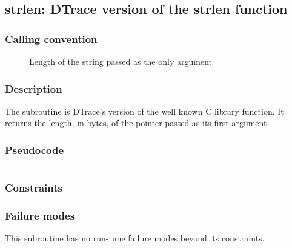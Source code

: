 \clearpage
{}
{}
\label{subr:strlen}
\subsection*{strlen: DTrace version of the strlen function}

\subsubsection*{Calling convention}

\begin{description}
\item[] Length of the string passed as the only argument
\end{description}

\subsubsection*{Description}

The  subroutine is DTrace's version of the well
known C library function.  It returns the length, in bytes, of the
pointer passed as its first argument.

\subsubsection*{Pseudocode}

\begin{verbatim}
\end{verbatim}

\subsubsection*{Constraints}

\subsubsection*{Failure modes}

This subroutine has no run-time failure modes beyond its constraints.
